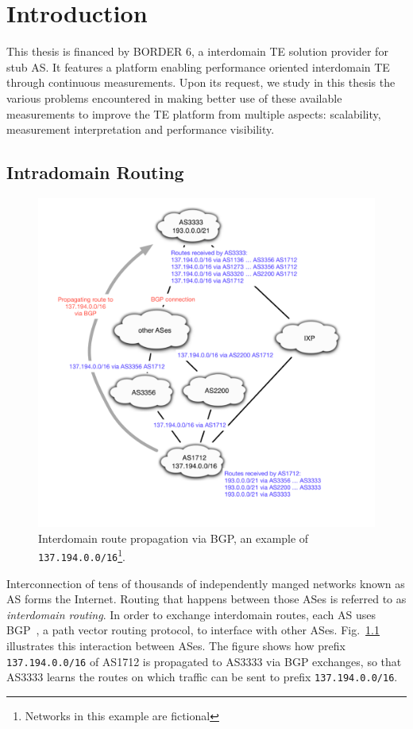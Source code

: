 \chapter{Introduction}
\label{sec:intro}

\iffale
This thesis is financed by BORDER 6, a interdomain \acf{TE} solution provider for stub \acf{AS}. 
It features a platform enabling performance oriented interdomain TE through continuous measurements.
Upon its request, we study in this thesis the various problems encountered in making better use of these available measurements to improve the TE platform from multiple aspects: scalability, measurement interpretation and performance visibility.
\fi

\section{Intradomain Routing}
\begin{figure}[!htb]
\centering
\includegraphics[width=\textwidth]{gfx/chap1/bgp_route_propagation.pdf}
\caption{Interdomain route propagation via \acf{BGP}, an example of \texttt{137.194.0.0/16}\footnote{Networks in this example are fictional}.}
\label{fig:bgp_propa}
\end{figure}

Interconnection of tens of thousands of independently manged networks known as \acf{AS} forms the Internet.
Routing that happens between those ASes is referred to as 
\textit{interdomain routing}.
In order to exchange interdomain routes, each AS uses \acf{BGP}~\cite{bgp4}, a path vector routing protocol, to interface with other ASes.
Fig.~\ref{fig:bgp_propa} illustrates this interaction between ASes. The figure shows how prefix \texttt{137.194.0.0/16} of AS1712 is propagated  to AS3333 via BGP exchanges, so that AS3333 learns the routes on which traffic can be sent to prefix \texttt{137.194.0.0/16}.

